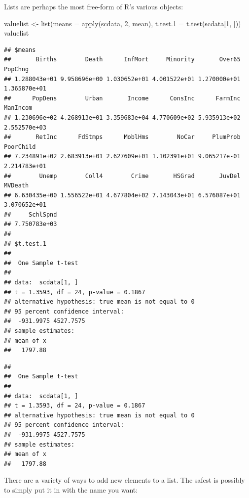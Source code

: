 \documentclass[
]{book}
\newenvironment{Shaded}{\begin{snugshade}}{\end{snugshade}}
\newcommand{\AttributeTok}[1]{\textcolor[rgb]{0.77,0.63,0.00}{#1}}
\newcommand{\DecValTok}[1]{\textcolor[rgb]{0.00,0.00,0.81}{#1}}
\newcommand{\FloatTok}[1]{\textcolor[rgb]{0.00,0.00,0.81}{#1}}
\newcommand{\FunctionTok}[1]{\textcolor[rgb]{0.00,0.00,0.00}{#1}}
\newcommand{\NormalTok}[1]{#1}
\newcommand{\OtherTok}[1]{\textcolor[rgb]{0.56,0.35,0.01}{#1}}
\newcommand{\SpecialCharTok}[1]{\textcolor[rgb]{0.00,0.00,0.00}{#1}}
\begin{document}
Lists are perhaps the most free-form of R's various objects:

\begin{Shaded}
\begin{Highlighting}[]
\NormalTok{valuelist }\OtherTok{\textless{}{-}} \FunctionTok{list}\NormalTok{(}\AttributeTok{means =} \FunctionTok{apply}\NormalTok{(scdata, }\DecValTok{2}\NormalTok{, mean), }\AttributeTok{t.test.1 =} \FunctionTok{t.test}\NormalTok{(scdata[}\DecValTok{1}\NormalTok{, ]))}
\NormalTok{valuelist}
\end{Highlighting}
\end{Shaded}

\begin{verbatim}
## $means
##       Births        Death      InfMort     Minority       Over65      PopChng 
## 1.288043e+01 9.958696e+00 1.030652e+01 4.001522e+01 1.270000e+01 1.365870e+01 
##      PopDens        Urban       Income      ConsInc      FarmInc     ManIncom 
## 1.230696e+02 4.268913e+01 3.359683e+04 4.770609e+02 5.935913e+02 2.552570e+03 
##       RetInc      FdStmps      MoblHms        NoCar     PlumProb    PoorChild 
## 7.234891e+02 2.683913e+01 2.627609e+01 1.102391e+01 9.065217e-01 2.214783e+01 
##        Unemp        Coll4        Crime       HSGrad       JuvDel      MVDeath 
## 6.630435e+00 1.556522e+01 4.677804e+02 7.143043e+01 6.576087e+01 3.070652e+01 
##     SchlSpnd 
## 7.750783e+03 
## 
## $t.test.1
## 
##  One Sample t-test
## 
## data:  scdata[1, ]
## t = 1.3593, df = 24, p-value = 0.1867
## alternative hypothesis: true mean is not equal to 0
## 95 percent confidence interval:
##  -931.9975 4527.7575
## sample estimates:
## mean of x 
##   1797.88
\end{verbatim}

\begin{Shaded}
\end{Shaded}

\begin{verbatim}
## 
##  One Sample t-test
## 
## data:  scdata[1, ]
## t = 1.3593, df = 24, p-value = 0.1867
## alternative hypothesis: true mean is not equal to 0
## 95 percent confidence interval:
##  -931.9975 4527.7575
## sample estimates:
## mean of x 
##   1797.88
\end{verbatim}

There are a variety of ways to add new elements to a list. The safest is possibly to simply put it in with the name you want:
\end{document}
